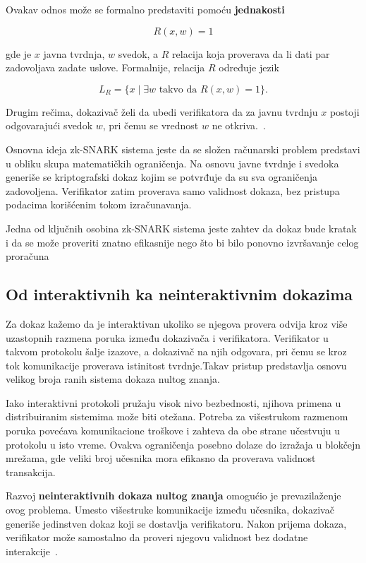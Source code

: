 Ovakav odnos može se formalno predstaviti pomoću \textbf{jednakosti}

\[
R(x, w)=1
\]

gde je \(x\) javna tvrdnja, \(w\) svedok, a \(R\) relacija koja proverava da li dati par zadovoljava zadate uslove. Formalnije, relacija \(R\) određuje jezik

\[
L_R=\{x \mid \exists w \text{ takvo da } R(x,w)=1\}.
\]

Drugim rečima, dokazivač želi da ubedi verifikatora da za javnu tvrdnju \(x\) postoji odgovarajući svedok \(w\), pri čemu se vrednost \(w\) ne otkriva.~\cite{nitulescu2023snarks}.

Osnovna ideja zk-SNARK sistema jeste da se složen računarski problem predstavi u obliku skupa matematičkih ograničenja. Na osnovu javne tvrdnje i svedoka generiše se kriptografski dokaz kojim se potvrđuje da su sva ograničenja zadovoljena. Verifikator zatim proverava samo validnost dokaza, bez pristupa podacima korišćenim tokom izračunavanja.

Jedna od ključnih osobina zk-SNARK sistema jeste zahtev da dokaz bude kratak i da se može proveriti znatno efikasnije nego što bi bilo ponovno izvršavanje celog proračuna~\cite{nitulescu2023snarks}


\subsection{Od interaktivnih ka neinteraktivnim dokazima}

Za dokaz kažemo da je interaktivan ukoliko se njegova provera odvija kroz više uzastopnih razmena poruka između dokazivača i verifikatora. Verifikator u takvom protokolu šalje izazove, a dokazivač na njih odgovara, pri čemu se kroz tok komunikacije proverava istinitost tvrdnje.Takav pristup predstavlja osnovu velikog broja ranih sistema dokaza nultog znanja.

Iako interaktivni protokoli pružaju visok nivo bezbednosti, njihova primena u distribuiranim sistemima može biti otežana. Potreba za višestrukom razmenom poruka povećava komunikacione troškove i zahteva da obe strane učestvuju u protokolu u isto vreme. Ovakva ograničenja posebno dolaze do izražaja u blokčejn mrežama, gde veliki broj učesnika mora efikasno da proverava validnost transakcija.

Razvoj \textbf{neinteraktivnih dokaza nultog znanja} omogućio je prevazilaženje ovog problema. Umesto višestruke komunikacije između učesnika, dokazivač generiše jedinstven dokaz koji se dostavlja verifikatoru. Nakon prijema dokaza, verifikator može samostalno da proveri njegovu validnost bez dodatne interakcije~\cite{nitulescu2023snarks}.

